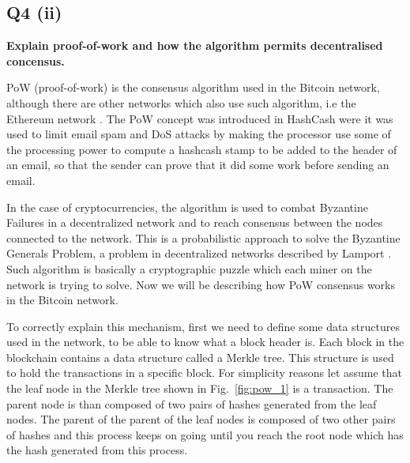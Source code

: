 
\subsection{Q4 (ii)}\label{sssec:pt2q4ii}
\textbf{Explain proof-of-work and how the algorithm permits decentralised concensus.}

\noindent
PoW (proof-of-work) is the consensus algorithm used in the Bitcoin \cite{nakamoto2008bitcoin} network, although there are other networks which also use such algorithm, i.e the Ethereum network \cite{wood2014ethereum}. The PoW concept was introduced in HashCash were it was used to limit email spam \cite{dwork1992pricing} and DoS attacks \cite{back2002hashcash} by making the processor use some of the processing power to compute a hashcash stamp to be added to the header of an email, so that the sender can prove that it did some work before sending an email. 

\noindent
In the case of cryptocurrencies, the algorithm is used to combat Byzantine Failures in a decentralized network and to reach consensus between the nodes connected to the network. This is a probabilistic approach to solve the Byzantine Generals Problem, a problem in decentralized networks described by Lamport \cite{lamport1982byzantine}. Such algorithm is basically a cryptographic puzzle which each miner on the network is trying to solve. Now we will be describing how PoW consensus works in the Bitcoin network. 

\noindent
To correctly explain this mechanism, first we need to define some data structures used in the network, to be able to know what a block header is. Each block in the blockchain contains a data structure called a Merkle tree. This structure is used to hold the transactions in a specific block. For simplicity reasons let assume that the leaf node in the Merkle tree shown in Fig.~\ref{fig:pow_1} is a transaction. The parent node is than composed of two pairs of hashes generated from the leaf nodes. The parent of the parent of the leaf nodes is composed of two other pairs of hashes and this process keeps on going until you reach the root node which has the hash generated from this process. 

